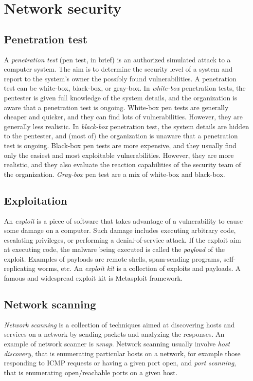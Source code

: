 \documentclass[a4paper,12pt]{article}
\begin{document}
\newpage

\section{Network security}
\subsection{Penetration test}
A \textit{penetration test} (pen test, in brief) is an authorized simulated attack to a computer system. The aim is to determine the security level of a system and report to the system’s owner the possibly found vulnerabilities. A penetration test can be white-box, black-box, or gray-box. In \textit{white-box} penetration tests, the pentester is given full knowledge of the system details, and the organization is aware that a penetration test is ongoing. White-box pen tests are generally cheaper and quicker, and they can find lots of vulnerabilities. However, they are generally less realistic. In \textit{black-box} penetration test, the system details are hidden to the pentester, and (most of) the organization is unaware that a penetration test is ongoing. Black-box pen tests are more expensive, and they usually find only the easiest and most exploitable vulnerabilities. However, they are more realistic, and they also evaluate the reaction capabilities of the security team of the organization. \textit{Gray-box} pen test are a mix of white-box and black-box.

\subsection{Exploitation}
An \textit{exploit} is a piece of software that takes advantage of a vulnerability to cause some damage on a computer. Such damage includes executing arbitrary code, escalating privileges, or performing a denial-of-service attack. If the exploit aim at executing code, the malware being executed is called the \textit{payload} of the exploit. Examples of payloads are remote shells, spam-sending programs, self-replicating worms, etc. An \textit{exploit kit} is a collection of exploits and payloads. A famous and widespread exploit kit is Metasploit framework.

\subsection{Network scanning}
\textit{Network scanning} is a collection of techniques aimed at discovering hosts and services on a network by sending packets and analyzing the responses. An example of network scanner is \textit{nmap}.
Network scanning usually involve \textit{host discovery}, that is enumerating particular hosts on a network, for example those responding to ICMP requests or having a given port open, and \textit{port scanning}, that is enumerating open/reachable ports on a given host.
\end{document}
